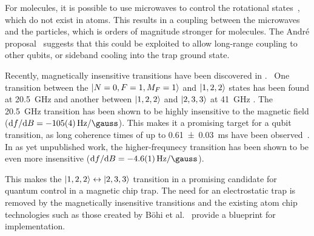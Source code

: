 %
For molecules, it is possible to use microwaves to control the rotational
states~\cite{Blackmore_2018}, which do not exist in atoms. This results in a
coupling between the microwaves and the particles, which is orders of magnitude
stronger for molecules. The Andr\'e proposal~\cite{Andre2006} suggests that this
could be exploited to allow long-range coupling to other qubits, or sideband
cooling into the trap ground state.

%
Recently, magnetically insensitive transitions have been discovered in
\CaF{}.~\cite{PhysRevLett.120.163201, Blackmore_201, }  One transition between
the $\ket{N=0, F=1, M_F=1}$ and $\ket{1,2,2}$ states has been found at
\SI{20.5}{\giga\hertz} and another between $\ket{1,2,2}$ and $\ket{2,3,3}$ at
\SI{41}{\giga\hertz} . The \SI{20.5}{\giga\hertz} transition has been shown to
be highly insensitive to the magnetic field ($\dd f / \dd B =
-\SI{105(4)}{\hertz\per\gauss}$). This makes it a promising target for a qubit
transition, as long coherence times of up to \SI{0.61(3)}{\milli\second} have
been observed~\cite{Blackmore_2018}. In as yet unpublished work, the
higher-frequnecy transition has been shown to be even more insensitive ($\dd f /
\dd B = -\SI{4.6(1)}{\hertz\per\gauss}$). 

This makes the $\ket{1,2,2} \leftrightarrow \ket{2,3,3}$  transition in \CaF{} a
promising candidate for quantum control in a magnetic chip trap. The need for an
electrostatic trap is removed by the magnetically insensitive transitions and
the existing atom chip technologies such as those created by B\"ohi et
al.~\cite{Boehi2009} provide a blueprint for implementation.
